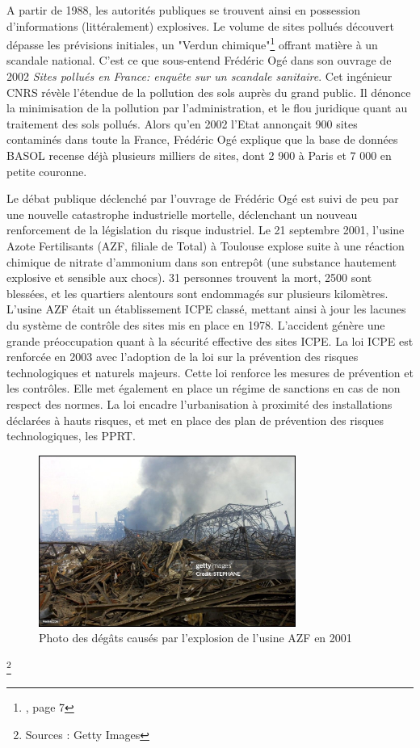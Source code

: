 \documentclass[a4paper,twoside,12pt]{book}
\begin{document}

A partir de 1988, les autorités publiques se trouvent ainsi en possession d'informations (littéralement) explosives. Le volume de sites pollués découvert dépasse les prévisions initiales, un "Verdun chimique"\footnote{\cite{oge_sites_2004}, page 7} offrant matière à un scandale national. C'est ce que sous-entend Frédéric Ogé dans son ouvrage de 2002 \textit{Sites pollués en France: enquête sur un scandale sanitaire}. Cet ingénieur CNRS révèle l'étendue de la pollution des sols auprès du grand public. Il dénonce la minimisation de la pollution par l'administration, et le flou juridique quant au traitement des sols pollués. Alors qu'en 2002 l'Etat annonçait 900 sites contaminés dans toute la France, Frédéric Ogé explique que la base de données BASOL recense déjà plusieurs milliers de sites, dont 2 900 à Paris et 7 000 en petite couronne. 

Le débat publique déclenché par l'ouvrage de Frédéric Ogé est suivi de peu par une nouvelle catastrophe industrielle mortelle, déclenchant un nouveau renforcement de la législation du risque industriel. Le 21 septembre 2001, l'usine Azote Fertilisants (AZF, filiale de Total) à Toulouse explose suite à une réaction chimique de nitrate d'ammonium dans son entrepôt (une substance hautement explosive et sensible aux chocs). 31 personnes trouvent la mort, 2500 sont blessées, et les quartiers alentours sont endommagés sur plusieurs kilomètres. L'usine AZF était un établissement ICPE classé, mettant ainsi à jour les lacunes du système de contrôle des sites mis en place en 1978. L'accident génère une grande préoccupation quant à la sécurité effective des sites ICPE. La loi ICPE est renforcée en 2003 avec l'adoption de la loi sur la prévention des risques technologiques et naturels majeurs. Cette loi renforce les mesures de prévention et les contrôles. Elle met également en place un régime de sanctions en cas de non respect des normes. La loi encadre l’urbanisation à proximité des installations déclarées à hauts risques, et met en place des plan de prévention des risques technologiques, les PPRT.           

 \vspace{1em} 
\begin{figure}[!h]
\centering 
\includegraphics[width=0.75\textwidth]{img/chapitre2/explositionAZF.jpeg}
\caption{Photo des dégâts causés par l'explosion de l'usine AZF en 2001}
\end{figure}\footnote{Sources : Getty Images}
\end{document}
